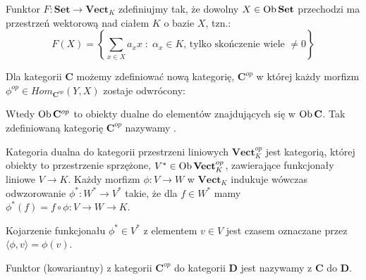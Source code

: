\begin{example}
\item Funktor $F:\mathbf{Set}\to \mathbf{Vect}_K$ zdefiniujmy tak, że dowolny $X\in\operatorname{Ob}\mathbf{Set}$ przechodzi ma przestrzeń wektorową nad ciałem $K$ o bazie $X$, tzn.:
  $$F(X)=\left\{\sum_{x\in X} a_xx\;:\;\alpha_x\in K\text{, tylko skończenie wiele }\neq0\right\}$$
\end{example}

\begin{definition}
  Dla kategorii $\mathbf{C}$ możemy zdefiniować nową kategorię, $\mathbf{C}^{op}$ w której każdy morfizm $\phi^{op}\in Hom_{\mathbf{C}^{op}}(Y, X)$ zostaje odwrócony:
  \begin{center}\end{center}
  Wtedy $\operatorname{Ob}\mathbf{C}^{op}$ to obiekty dualne do elementów znajdujących się w $\operatorname{Ob}\mathbf{C}$. Tak zdefiniowaną kategorię $\mathbf{C}^{op}$ nazywamy .
\end{definition}

\begin{example}
\item Kategoria dualna do kategorii przestrzeni liniowych $\mathbf{Vect}_K^{op}$ jest kategorią, której obiekty to przestrzenie sprzężone, $V^*\in\operatorname{Ob}\mathbf{Vect}^{op}_K$, zawierające funkcjonały liniowe $V\to K$. Każdy morfizm $\phi:V\to W$ w $\mathbf{Vect}_K$ indukuje wówczas odwzorowanie $\phi^*:W^*\to V^*$ takie, że dla $f\in W^*$ mamy $\phi^*(f)=f\circ\phi:V\to W\to K$.

  Kojarzenie funkcjonału $\phi^*\in V^*$ z elementem $v\in V$ jest czasem oznaczane przez $\langle \phi, v\rangle=\phi(v)$.
\end{example}

\begin{definition}
  Funktor (kowariantny) z kategorii $\mathbf{C}^{op}$ do kategorii $\mathbf{D}$ jest nazywamy  z $\mathbf{C}$ do $\mathbf{D}$.
\end{definition}

